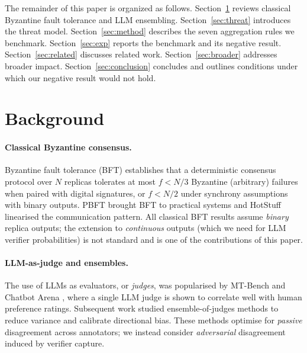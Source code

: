 \documentclass[11pt]{article}
\begin{document}
The remainder of this paper is organized as follows.
Section~\ref{sec:background} reviews classical Byzantine fault tolerance and
LLM ensembling. Section~\ref{sec:threat} introduces the threat model.
Section~\ref{sec:method} describes the seven aggregation rules we benchmark.
Section~\ref{sec:exp} reports the benchmark and its negative result.
Section~\ref{sec:related} discusses related work.
Section~\ref{sec:broader} addresses broader impact.
Section~\ref{sec:conclusion} concludes and outlines conditions under which
our negative result would not hold.

\section{Background}
\label{sec:background}

\paragraph{Classical Byzantine consensus.}
Byzantine fault tolerance (BFT) \citep{lamport1982byzantine} establishes
that a deterministic consensus protocol over $N$ replicas tolerates at
most $f < N/3$ Byzantine (arbitrary) failures when paired with digital
signatures, or $f < N/2$ under synchrony assumptions with binary outputs.
PBFT \citep{castro1999pbft} brought BFT to practical systems and
HotStuff \citep{yin2019hotstuff} linearised the communication pattern.
All classical BFT results assume \emph{binary} replica outputs; the
extension to \emph{continuous} outputs (which we need for LLM verifier
probabilities) is not standard and is one of the contributions of this
paper.

\paragraph{LLM-as-judge and ensembles.}
The use of LLMs as evaluators, or \emph{judges}, was popularised by
MT-Bench and Chatbot Arena \citep{zheng2023judging}, where a single
LLM judge is shown to correlate well with human preference ratings.
Subsequent work studied ensemble-of-judges methods
\citep{cui2026edo,leung2026rubricllm} to reduce variance and calibrate
directional bias. These methods optimise for \emph{passive} disagreement
across annotators; we instead consider \emph{adversarial} disagreement
induced by verifier capture.
\end{document}
